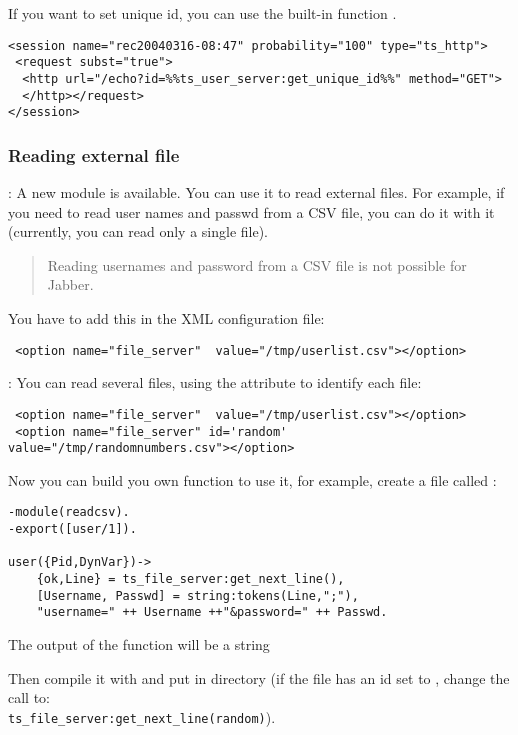 \documentclass{TSUNG-en}
\begin{document}
If you want to set unique id, you can use the built-in function
.
\begin{Verbatim}
<session name="rec20040316-08:47" probability="100" type="ts_http">
 <request subst="true">
  <http url="/echo?id=%%ts_user_server:get_unique_id%%" method="GET">
  </http></request>
</session>
\end{Verbatim}

\subsubsection{Reading external file}
: A new  module  is available. You
can use it to read external files. For example, if you need to read user
names and passwd from a CSV file, you can do it with it (currently,
you can read only a single file).

\begin{quote}
  Reading usernames and password from a CSV file is not possible for Jabber.
\end{quote}

You have to add this in the XML configuration file:
\begin{Verbatim}
 <option name="file_server"  value="/tmp/userlist.csv"></option>
\end{Verbatim}

: You can read several files, using the 
attribute to identify each file:
\begin{Verbatim}
 <option name="file_server"  value="/tmp/userlist.csv"></option>
 <option name="file_server" id='random' value="/tmp/randomnumbers.csv"></option>
\end{Verbatim}

Now you can build you own function to use it, for example, create a
file called :

\begin{Verbatim}
-module(readcsv).
-export([user/1]).

user({Pid,DynVar})->
    {ok,Line} = ts_file_server:get_next_line(),
    [Username, Passwd] = string:tokens(Line,";"),
    "username=" ++ Username ++"&password=" ++ Passwd.
\end{Verbatim}

The output of the function will be a string 

Then compile it with  and put
 in
 directory  (if the
file has an id set to , change the call to: \\
\texttt{ts\_file\_server:get\_next\_line(random)}).
\end{document}
